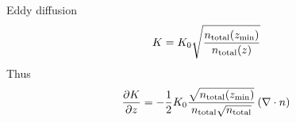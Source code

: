 Eddy diffusion 
\begin{equation}
K = K_0  \sqrt{\frac{n_\text{total}(z_\text{min})}{n_\text{total}(z)}}
\label{Titan:eddy_diff}
\end{equation}
Thus
\begin{equation}
\frac{\partial K}{\partial z} = -\frac{1}{2} K_0  \frac{\sqrt{n_\text{total}(z_\text{min})}}{n_\text{total}\sqrt{n_\text{total}}}\left(\nabla\cdot{\ensuremath{n}}\right)
\label{Titan:eddy_diff_deriv}
\end{equation}
